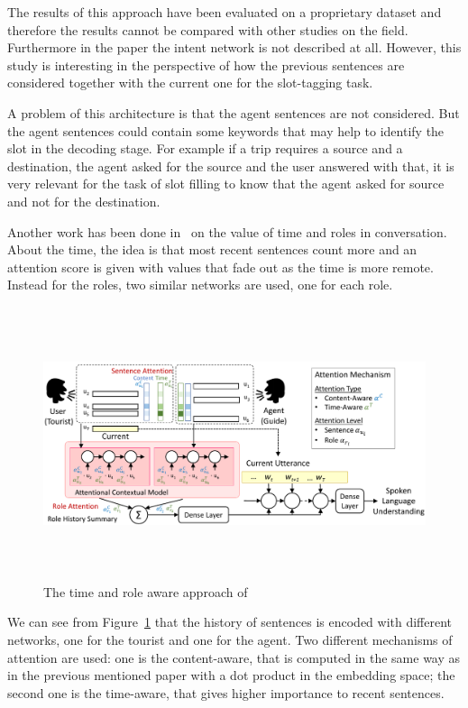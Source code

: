 The results of this approach have been evaluated on a proprietary dataset and therefore the results cannot be compared with other studies on the field. Furthermore in the paper the intent network is not described at all. However, this study is interesting in the perspective of how the previous sentences are considered together with the current one for the slot-tagging task.

A problem of this architecture is that the agent sentences are not considered. But the agent sentences could contain some keywords that may help to identify the slot in the decoding stage. For example if a trip requires a source and a destination, the agent asked for the source and the user answered with that, it is very relevant for the task of slot filling to know that the agent asked for source and not for the destination.

Another work has been done in~\cite{chen2017dynamic} on the value of time and roles in conversation. About the time, the idea is that most recent sentences count more and an attention score is given with values that fade out as the time is more remote. Instead for the roles, two similar networks are used, one for each role.

\begin{figure}[!htb]
    \centering
    \includegraphics[max width=0.9\linewidth,max height=8cm,keepaspectratio]{figures/timeRoleSLUchen}
    \caption{The time and role aware approach of~\cite{chen2017dynamic}}\label{fig:timeRoleSLUchen}
\end{figure}

We can see from Figure~\ref{fig:timeRoleSLUchen} that the history of sentences is encoded with different networks, one for the tourist and one for the agent. Two different mechanisms of attention are used: one is the content-aware, that is computed in the same way as in the previous mentioned paper with a dot product in the embedding space; the second one is the time-aware, that gives higher importance to recent sentences.


